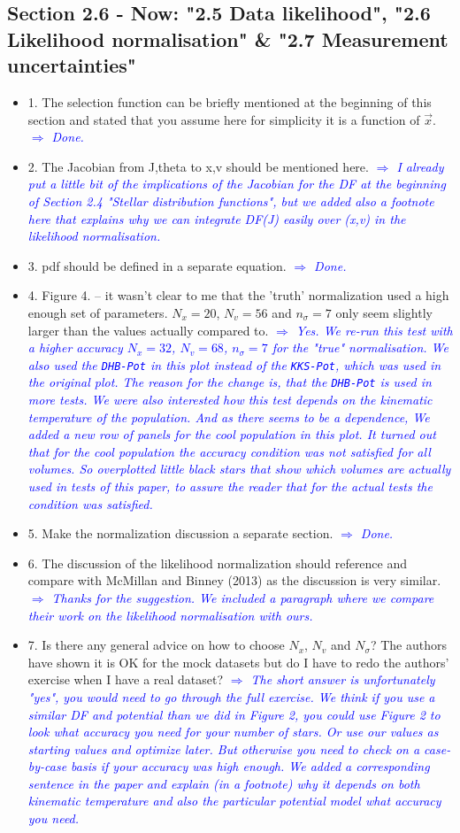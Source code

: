 \documentclass[10pt,a4paper]{article}
\newcommand{\Comment}[1]{\textsl{\textcolor{Blue}{$\Longrightarrow$ {#1}}}}
\begin{document}
\subsection{Section 2.6 - Now: "2.5 Data likelihood", "2.6 Likelihood normalisation" \& "2.7 Measurement uncertainties"}
\begin{itemize}
\item 1. The selection function can be briefly mentioned at the beginning of this section and stated that you assume here for simplicity it is a function of $\vec{x}$. \Comment{Done.}
\item 2. The Jacobian from J,theta to x,v should be mentioned here. \Comment{I already put a little bit of the implications of the Jacobian for the DF at the beginning of Section 2.4 "Stellar distribution functions", but we added also a footnote here that explains why we can integrate DF(J) easily over (x,v) in the likelihood normalisation.}
\item 3. pdf should be defined in a separate equation. \Comment{Done.}
\item 4. Figure 4. -- it wasn't clear to me that the 'truth' normalization used a high enough set of parameters. $N_x=20$, $N_v=56$ and $n_\sigma=7$ only seem slightly larger than the values actually compared to. \Comment{Yes. We re-run this test with a higher accuracy $N_x=32$, $N_v = 68$, $n_\sigma = 7$ for the "true" normalisation.  We also used the \texttt{DHB-Pot} in this plot instead of the \texttt{KKS-Pot}, which was used in the original plot. The reason for the change is, that the \texttt{DHB-Pot} is used in more tests. We were also interested how this test depends on the kinematic temperature of the population. And as there seems to be a dependence, We added a new row of panels for the cool population in this plot. It turned out that for the cool population the accuracy condition was not satisfied for all volumes. So overplotted little black stars that show which volumes are actually used in tests of this paper, to assure the reader that for the actual tests the condition was satisfied.}
\item 5. Make the normalization discussion a separate section. \Comment{Done.}
\item 6. The discussion of the likelihood normalization should reference and compare with McMillan and Binney (2013) as the discussion is very similar. \Comment{Thanks for the suggestion. We included a paragraph where we compare their work on the likelihood normalisation with ours.}
\item 7. Is there any general advice on how to choose $N_x$, $N_v$ and $N_\sigma$? The authors have shown it is OK for the mock datasets but do I have to redo the authors' exercise when I have a real dataset? \Comment{The short answer is unfortunately "yes", you would need to go through the full exercise. We think if you use a similar DF and potential than we did in Figure 2, you could use Figure 2 to look what accuracy you need for your number of stars. Or use our values as starting values and optimize later. But otherwise you need to check on a case-by-case basis if your accuracy was high enough. We added a corresponding sentence in the paper and explain (in a footnote) why it depends on both kinematic temperature and also the particular potential model what accuracy you need.}

\end{itemize}
\end{document}
